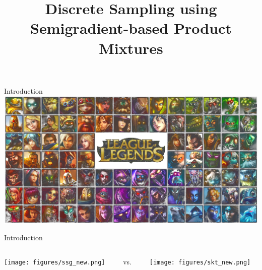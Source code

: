 \documentclass[mathserif]{beamer}
\title[Discrete Sampling using Semigradient-based Product Mixtures]
{Discrete Sampling using Semigradient-based Product Mixtures}
\author[Alkis Gotovos]{}
\begin{document}


\begin{frame}{Introduction}
\vspace{0.2in}
\centering
\includegraphics[width=\textwidth]{figures/champions_transparent.png}
\end{frame}

\begin{frame}{Introduction}
\vspace{0.2in}
\centering
\begin{columns}
\begin{column}{0.3\textwidth}
\hfill
\texttt{[image: figures/ssg\_new.png]}
\end{column}
\begin{column}{0.1\textwidth}
\centering
{\Large vs.}
\end{column}
\begin{column}{0.3\textwidth}
\texttt{[image: figures/skt\_new.png]}
\hfill
\end{column}
\end{columns}
\end{frame}
\end{document}
